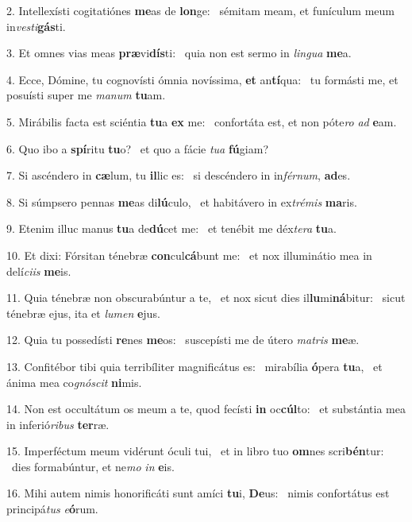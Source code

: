 2. Intellexísti cogitatiónes \textbf{me}as de \textbf{lon}ge: \ast\  sémitam meam, et funículum meum in\textit{ves}\textit{ti}\textbf{gás}ti.\

3. Et omnes vias meas \textbf{præ}vi\textbf{dís}ti: \ast\  quia non est sermo in \textit{lin}\textit{gua} \textbf{me}a.\

4. Ecce, Dómine, tu cognovísti ómnia novíssima, \textbf{et} an\textbf{tí}qua: \ast\  tu formásti me, et posuísti super me \textit{ma}\textit{num} \textbf{tu}am.\

5. Mirábilis facta est sciéntia \textbf{tu}a \textbf{ex} me: \ast\  confortáta est, et non póte\textit{ro} \textit{ad} \textbf{e}am.\

6. Quo ibo a \textbf{spí}ritu \textbf{tu}o? \ast\  et quo a fácie \textit{tu}\textit{a} \textbf{fú}giam?\

7. Si ascéndero in \textbf{cæ}lum, tu \textbf{il}lic es: \ast\  si descéndero in in\textit{fér}\textit{num}, \textbf{ad}es.\

8. Si súmpsero pennas \textbf{me}as di\textbf{lú}culo, \ast\  et habitávero in ex\textit{tré}\textit{mis} \textbf{ma}ris.\

9. Etenim illuc manus \textbf{tu}a de\textbf{dú}cet me: \ast\  et tenébit me déx\textit{te}\textit{ra} \textbf{tu}a.\

10. Et dixi: Fórsitan ténebræ \textbf{con}cul\textbf{cá}bunt me: \ast\  et nox illuminátio mea in delí\textit{ci}\textit{is} \textbf{me}is.\

11. Quia ténebræ non obscurabúntur a te, \dag\  et nox sicut dies il\textbf{lu}mi\textbf{ná}bitur: \ast\  sicut ténebræ ejus, ita et \textit{lu}\textit{men} \textbf{e}jus.\

12. Quia tu possedísti \textbf{re}nes \textbf{me}os: \ast\  suscepísti me de útero \textit{ma}\textit{tris} \textbf{me}æ.\

13. Confitébor tibi quia terribíliter magnificátus es: \dag\  mirabília \textbf{ó}pera \textbf{tu}a, \ast\  et ánima mea co\textit{gnó}\textit{scit} \textbf{ni}mis.\

14. Non est occultátum os meum a te, quod fecísti \textbf{in} oc\textbf{cúl}to: \ast\  et substántia mea in inferió\textit{ri}\textit{bus} \textbf{ter}ræ.\

15. Imperféctum meum vidérunt óculi tui, \dag\  et in libro tuo \textbf{om}nes scri\textbf{bén}tur: \ast\  dies formabúntur, et ne\textit{mo} \textit{in} \textbf{e}is.\

16. Mihi autem nimis honorificáti sunt amíci \textbf{tu}i, \textbf{De}us: \ast\  nimis confortátus est principá\textit{tus} \textit{e}\textbf{ó}rum.\

